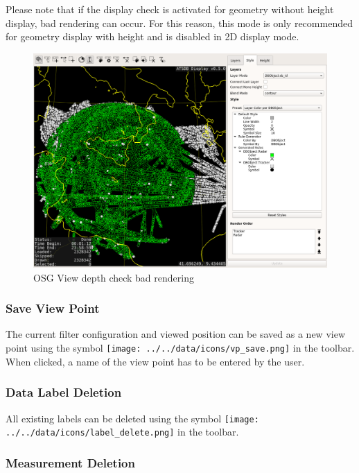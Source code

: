 Please note that if the display check is activated for geometry without height display, bad rendering can occur. For this reason, this mode is only recommended for geometry display with height and is disabled in 2D display mode.

\begin{figure}[H]
    \hspace*{-2.5cm}
    \includegraphics[width=19cm,frame]{figures/osgview_depth_check_bad.png}
  \caption{OSG View depth check bad rendering}
\end{figure}

\subsubsection{Save View Point}

The current filter configuration and viewed position can be saved as a new view point using the symbol \texttt{[image: ../../data/icons/vp\_save.png]} in the toolbar. When clicked, a name of the view point has to be entered by the user. 

\subsubsection{Data Label Deletion}

All existing labels can be deleted using the symbol \texttt{[image: ../../data/icons/label\_delete.png]} in the toolbar.

\subsubsection{Measurement Deletion}

